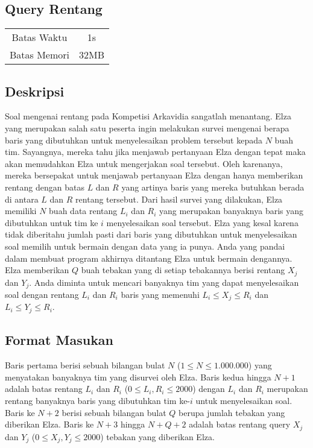 \documentclass{article}
\begin{document}
\begin{center}
    \section*{Query Rentang} %

    \begin{tabular}{ | c c | }
        \hline
        Batas Waktu  & 1s \\    %
        Batas Memori & 32MB \\  %
        \hline
    \end{tabular}
\end{center}

\subsection*{Deskripsi}

Soal mengenai rentang pada Kompetisi Arkavidia sangatlah menantang.
Elza yang merupakan salah satu peserta ingin melakukan survei mengenai berapa baris yang dibutuhkan untuk menyelesaikan problem tersebut kepada $N$ buah tim.
Sayangnya, mereka tahu jika menjawab pertanyaan Elza dengan tepat maka akan memudahkan Elza untuk mengerjakan soal tersebut.
Oleh karenanya, mereka bersepakat untuk menjawab pertanyaan Elza dengan hanya memberikan rentang dengan batas $L$ dan $R$ yang artinya baris yang mereka butuhkan berada di antara $L$ dan $R$ rentang tersebut.
Dari hasil survei yang dilakukan, 
Elza memiliki $N$ buah data rentang $L_i$ dan $R_i$ yang merupakan banyaknya baris yang dibutuhkan untuk tim ke $i$ menyelesaikan soal tersebut.
Elza yang kesal karena tidak diberitahu jumlah pasti dari baris yang dibutuhkan untuk menyelesaikan soal memilih untuk bermain dengan data yang ia punya.
Anda yang pandai dalam membuat program akhirnya ditantang Elza untuk bermain dengannya.
Elza memberikan $Q$ buah tebakan yang di setiap tebakannya berisi rentang $X_j$ dan $Y_j$.
Anda diminta untuk mencari banyaknya tim yang dapat menyelesaikan soal dengan rentang $L_i$ dan $R_i$ baris yang memenuhi $L_i \leq X_j \leq R_i$ dan $L_i \leq Y_j \leq R_i$.


\subsection*{Format Masukan}
Baris pertama berisi sebuah bilangan bulat $N$ ($1 \leq N \leq 1.000.000$) yang menyatakan banyaknya tim yang disurvei oleh Elza.
Baris kedua hingga $N + 1$ adalah batas rentang $L_i$ dan $R_i$ ($0 \leq L_i,R_i \leq 2000$) dengan $L_i$ dan $R_i$ merupakan rentang banyaknya baris yang dibutuhkan tim ke-$i$ untuk menyelesaikan soal.
Baris ke $N + 2$ berisi sebuah bilangan bulat $Q$ berupa jumlah tebakan yang diberikan Elza.
Baris ke $N + 3$ hingga $N + Q + 2$ adalah batas rentang query $X_j$ dan $Y_j$ ($0 \leq X_j,Y_j \leq 2000$) tebakan yang diberikan Elza. 
\end{document}

